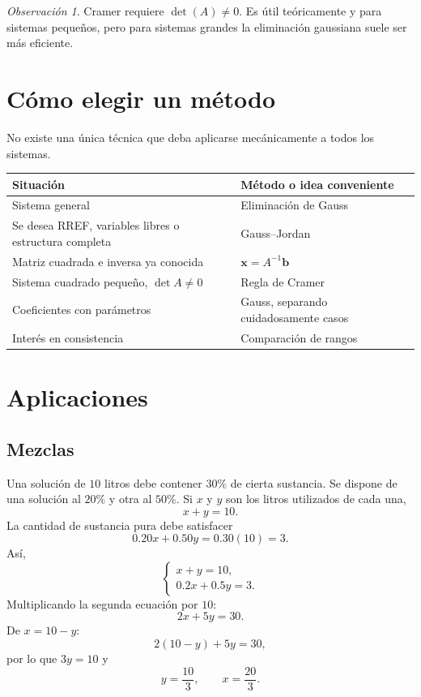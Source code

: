 \documentclass[12pt]{article}
\theoremstyle{remark}
\newtheorem{observacion}[definicion]{Observación}
\begin{document}
\begin{observacion}
Cramer requiere $\det(A)\neq0$. Es útil teóricamente y para sistemas pequeños, pero para sistemas
grandes la eliminación gaussiana suele ser más eficiente.
\end{observacion}

\section{Cómo elegir un método}

No existe una única técnica que deba aplicarse mecánicamente a todos los sistemas.

\begin{center}
\begin{tabular}{p{}p{}}
\toprule
\textbf{Situación} & \textbf{Método o idea conveniente}\\
\midrule
Sistema general & Eliminación de Gauss\\
Se desea RREF, variables libres o estructura completa & Gauss--Jordan\\
Matriz cuadrada e inversa ya conocida & $\mathbf x=A^{-1}\mathbf b$\\
Sistema cuadrado pequeño, $\det A\neq0$ & Regla de Cramer\\
Coeficientes con parámetros & Gauss, separando cuidadosamente casos\\
Interés en consistencia & Comparación de rangos\\
\bottomrule
\end{tabular}
\end{center}

\section{Aplicaciones}

\subsection{Mezclas}

Una solución de $10$ litros debe contener $30\%$ de cierta sustancia. Se dispone de una solución al
$20\%$ y otra al $50\%$. Si $x$ y $y$ son los litros utilizados de cada una,
\[
x+y=10.
\]
La cantidad de sustancia pura debe satisfacer
\[
0.20x+0.50y=0.30(10)=3.
\]
Así,
\[
\begin{cases}
x+y=10,\\
0.2x+0.5y=3.
\end{cases}
\]
Multiplicando la segunda ecuación por $10$:
\[
2x+5y=30.
\]
De $x=10-y$:
\[
2(10-y)+5y=30,
\]
por lo que $3y=10$ y
\[
y=\frac{10}{3},\qquad x=\frac{20}{3}.
\]
\end{document}
